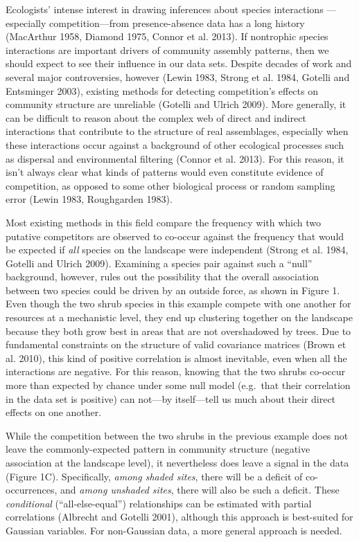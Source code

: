 \documentclass[12pt,]{article}
\begin{document}
\begin{spacing}{1.9}
\begin{flushleft}
Ecologists' intense interest in drawing inferences about species
interactions ---especially competition---from presence-absence data has
a long history (MacArthur 1958, Diamond 1975, Connor et al. 2013). If
nontrophic species interactions are important drivers of community
assembly patterns, then we should expect to see their influence in our
data sets. Despite decades of work and several major controversies,
however (Lewin 1983, Strong et al. 1984, Gotelli and Entsminger 2003),
existing methods for detecting competition's effects on community
structure are unreliable (Gotelli and Ulrich 2009). More generally, it
can be difficult to reason about the complex web of direct and indirect
interactions that contribute to the structure of real assemblages,
especially when these interactions occur against a background of other
ecological processes such as dispersal and environmental filtering
(Connor et al. 2013). For this reason, it isn't always clear what kinds
of patterns would even constitute evidence of competition, as opposed to
some other biological process or random sampling error (Lewin 1983,
Roughgarden 1983).

Most existing methods in this field compare the frequency with which two
putative competitors are observed to co-occur against the frequency that
would be expected if \emph{all} species on the landscape were
independent (Strong et al. 1984, Gotelli and Ulrich 2009). Examining a
species pair against such a ``null'' background, however, rules out the
possibility that the overall association between two species could be
driven by an outside force, as shown in Figure 1. Even though the two
shrub species in this example compete with one another for resources at
a mechanistic level, they end up clustering together on the landscape
because they both grow best in areas that are not overshadowed by trees.
Due to fundamental constraints on the structure of valid covariance
matrices (Brown et al. 2010), this kind of positive correlation is
almost inevitable, even when all the interactions are negative. For this
reason, knowing that the two shrubs co-occur more than expected by
chance under some null model (e.g.~that their correlation in the data
set is positive) can not---by itself---tell us much about their direct
effects on one another.

While the competition between the two shrubs in the previous example
does not leave the commonly-expected pattern in community structure
(negative association at the landscape level), it nevertheless does
leave a signal in the data (Figure 1C). Specifically, \emph{among shaded
sites}, there will be a deficit of co-occurrences, and \emph{among
unshaded sites}, there will also be such a deficit. These
\emph{conditional} (``all-else-equal'') relationships can be estimated
with partial correlations (Albrecht and Gotelli 2001), although this
approach is best-suited for Gaussian variables. For non-Gaussian data, a
more general approach is needed.


\end{flushleft}
\end{spacing}
\end{document}
